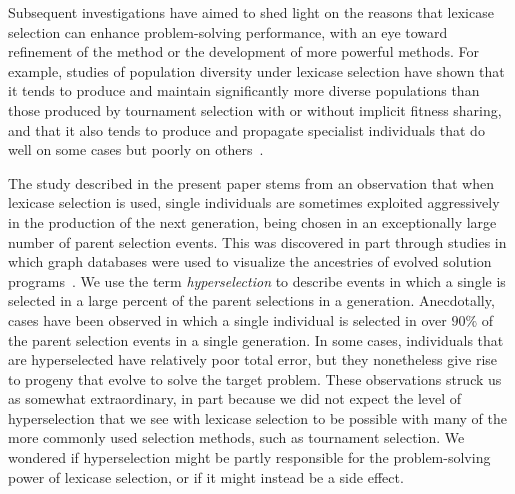\documentclass{sig-alternate}
\begin{document}
Subsequent investigations have aimed to shed light on the reasons that lexicase selection can enhance problem-solving performance, with an eye toward refinement of the method or the development of more powerful methods. For example, studies of population diversity under lexicase selection have shown that it tends to produce and maintain significantly more diverse populations than those produced by tournament selection with or without implicit fitness sharing, and that it also tends to produce and propagate specialist individuals that do well on some cases but poorly on others~\cite{Helmuth:2015:GPTP,Helmuth:2015:dissertation}.

The study described in the present paper stems from an observation that when lexicase selection is used, single individuals are sometimes exploited aggressively in the production of the next generation, being chosen in an exceptionally large number of parent selection events. This was discovered in part through studies in which graph databases were used to visualize the ancestries of evolved solution programs~\cite{McPhee:2015:GPTP}. We use the term \textit{hyperselection} to describe events in which a single is selected in a large percent of the parent selections in a generation. Anecdotally, cases have been observed in which a single individual is selected in over $90\%$ of the parent selection events in a single generation. In some cases, individuals that are hyperselected have relatively poor total error, but they nonetheless give rise to progeny that evolve to solve the target problem. These observations struck us as somewhat extraordinary, in part because we did not expect the level of hyperselection that we see with lexicase selection to be possible with many of the more commonly used selection methods, such as tournament selection. We wondered if hyperselection might be partly responsible for the problem-solving power of lexicase selection, or if it might instead be a side effect.

\end{document}
